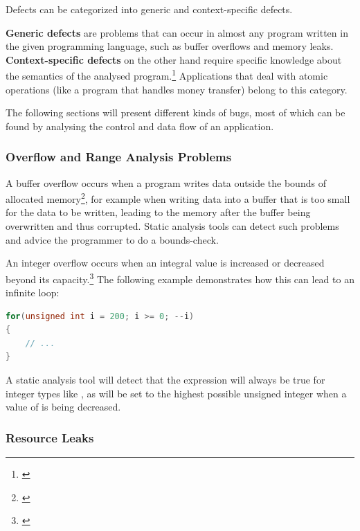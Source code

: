 Defects can be categorized into generic and context-specific defects.

\textbf{Generic defects} are problems that can occur in almost any program written in the given programming language, such as buffer overflows and memory leaks.\\
\newpage\textbf{Context-specific defects} on the other hand require specific knowledge about the semantics of the analysed program.\footnote{\citep[14]{SecureProgramming}} Applications that deal with atomic operations (like a program that handles money transfer) belong to this category.

The following sections will present different kinds of bugs, most of which can be found by analysing the control and data flow of an application.

\subsubsection{Overflow and Range Analysis Problems}

A buffer overflow occurs when a program writes data outside the bounds of allocated memory\footnote{\citep[175]{SecureProgramming}}, for example when writing data into a buffer that is too small for the data to be written, leading to the memory after the buffer being overwritten and thus corrupted. Static analysis tools can detect such problems and advice the programmer to do a bounds-check.

An integer overflow occurs when an integral value is increased or decreased beyond its capacity.\footnote{\citep[235]{SecureProgramming}} The following example demonstrates how this can lead to an infinite loop:

\SingleSpacing
\begin{lstlisting}[language=C++, caption=Integer \mySlang{underflow} in \myProperName{C++}]
for(unsigned int i = 200; i >= 0; --i)
{
	// ...
}
\end{lstlisting}
\OnehalfSpacing

A static analysis tool will detect that the expression  will always be true for  integer types like , as  will be set to the highest possible unsigned integer when a value of  is being decreased.

\subsubsection{Resource Leaks}

